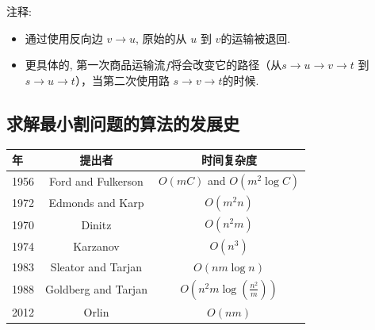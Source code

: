 \begin{figure}[H]
\end{figure}

注释:

\begin{itemize}
\item
通过使用反向边 $v\rightarrow u$, 原始的从 $u$ 到 $v$的运输被退回.
\item 更具体的,
 第一次商品运输流$f$将会改变它的路径（从$s\rightarrow u\rightarrow v\rightarrow t$ 到 $s\rightarrow u\rightarrow t$），当第二次使用路 $s\rightarrow v\rightarrow t$的时候.
 \end{itemize}

  \subsection{求解最小割问题的算法的发展史}
  \begin{table}[h]
  \center
   {\begin{tabular}{lcc}\hline
        年  & 提出者 &  时间复杂度  \\
\hline
1956 & Ford and Fulkerson & $O(m C)$ and $O(m^2\log C)$ \\
1972 & Edmonds and Karp & $O(m^2 n)$ \\
1970 & Dinitz & $O(n^2 m)$ \\
1974 & Karzanov & $O(n^3)$ \\
1983 & Sleator and Tarjan & $O(nm \log n)$ \\
1988 & Goldberg and Tarjan & $O(n^2 m \log(\frac{n^{2}}{m}))$ \\
2012  & Orlin	& $O(nm)$ \\ \hline

     \end{tabular}} {}%
 \end{table}

